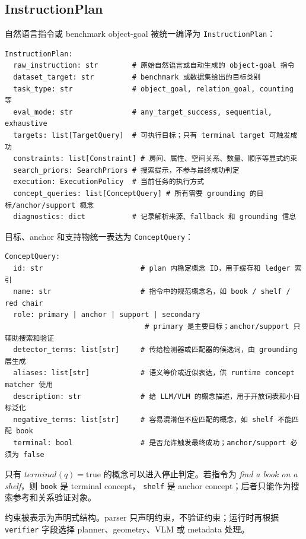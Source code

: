 \documentclass[UTF8,zihao=-4]{ctexart}
\begin{document}
\subsection{InstructionPlan}

自然语言指令或 benchmark object-goal 被统一编译为
\texttt{InstructionPlan}：

\begin{lstlisting}[style=pseudo,caption={InstructionPlan 的核心字段}]
InstructionPlan:
  raw_instruction: str        # 原始自然语言或自动生成的 object-goal 指令
  dataset_target: str         # benchmark 或数据集给出的目标类别
  task_type: str              # object_goal, relation_goal, counting 等
  eval_mode: str              # any_target_success, sequential, exhaustive
  targets: list[TargetQuery]  # 可执行目标；只有 terminal target 可触发成功
  constraints: list[Constraint] # 房间、属性、空间关系、数量、顺序等显式约束
  search_priors: SearchPriors # 搜索提示，不参与最终成功判定
  execution: ExecutionPolicy  # 当前任务的执行方式
  concept_queries: list[ConceptQuery] # 所有需要 grounding 的目标/anchor/support 概念
  diagnostics: dict           # 记录解析来源、fallback 和 grounding 信息
\end{lstlisting}

目标、anchor 和支持物统一表达为 \texttt{ConceptQuery}：

\begin{lstlisting}[style=pseudo,caption={ConceptQuery 的核心字段}]
ConceptQuery:
  id: str                       # plan 内稳定概念 ID，用于缓存和 ledger 索引
  name: str                     # 指令中的规范概念名，如 book / shelf / red chair
  role: primary | anchor | support | secondary
                                 # primary 是主要目标；anchor/support 只辅助搜索和验证
  detector_terms: list[str]     # 传给检测器或匹配器的候选词，由 grounding 层生成
  aliases: list[str]            # 语义等价或近似表达，供 runtime concept matcher 使用
  description: str              # 给 LLM/VLM 的概念描述，用于开放词表和小目标泛化
  negative_terms: list[str]     # 容易混淆但不应匹配的概念，如 shelf 不能匹配 book
  terminal: bool                # 是否允许触发最终成功；anchor/support 必须为 false
\end{lstlisting}

只有 $terminal(q)=\mathrm{true}$ 的概念可以进入停止判定。若指令为
\textit{find a book on a shelf}，则 \texttt{book} 是 terminal concept，
\texttt{shelf} 是 anchor concept；后者只能作为搜索参考和关系验证对象。

约束被表示为声明式结构。parser 只声明约束，不验证约束；运行时再根据
\texttt{verifier} 字段选择 planner、geometry、VLM 或 metadata 处理。
\end{document}
